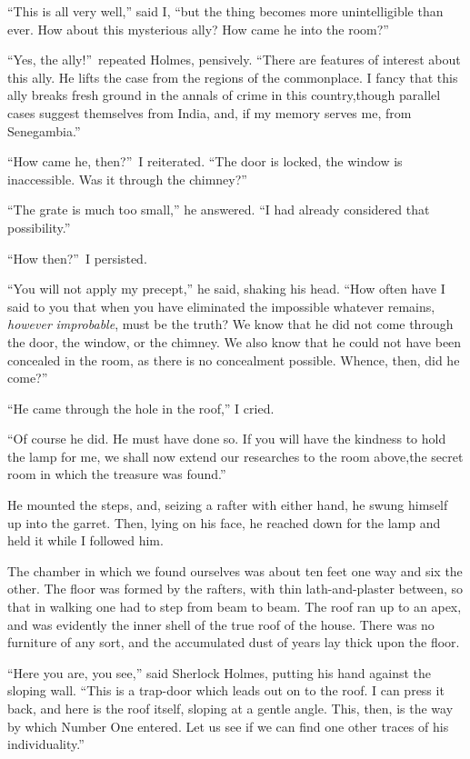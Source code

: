 \documentclass[12pt,english,oneside]{book}
\begin{document}
{}``This is all very well,'' said I, {}``but the thing becomes
more unintelligible than ever. How about this mysterious ally? How
came he into the room?''

{}``Yes, the ally!''\ repeated Holmes, pensively. {}``There are
features of interest about this ally. He lifts the case from the regions
of the commonplace. I fancy that this ally breaks fresh ground in
the annals of crime in this country,\mdsh{---}though parallel cases
suggest themselves from India, and, if my memory serves me, from Senegambia.''

{}``How came he, then?''\ I reiterated. {}``The door is locked,
the window is inaccessible. Was it through the chimney?''

{}``The grate is much too small,'' he answered. {}``I had already
considered that possibility.''

{}``How then?''\ I persisted.

{}``You will not apply my precept,'' he said, shaking his head.
{}``How often have I said to you that when you have eliminated the
impossible whatever remains, \textit{however} \textit{improbable},
must be the truth? We know that he did not come through the door,
the window, or the chimney. We also know that he could not have been
concealed in the room, as there is no concealment possible. Whence,
then, did he come?''

{}``He came through the hole in the roof,'' I cried.

{}``Of course he did. He must have done so. If you will have the
kindness to hold the lamp for me, we shall now extend our researches
to the room above,\mdsh{---}the secret room in which the treasure
was found.''

He mounted the steps, and, seizing a rafter with either hand, he swung
himself up into the garret. Then, lying on his face, he reached down
for the lamp and held it while I followed him.

The chamber in which we found ourselves was about ten feet one way
and six the other. The floor was formed by the rafters, with thin
lath-and-plaster between, so that in walking one had to step from
beam to beam. The roof ran up to an apex, and was evidently the inner
shell of the true roof of the house. There was no furniture of any
sort, and the accumulated dust of years lay thick upon the floor.

{}``Here you are, you see,'' said Sherlock Holmes, putting his hand
against the sloping wall. {}``This is a trap-door which leads out
on to the roof. I can press it back, and here is the roof itself,
sloping at a gentle angle. This, then, is the way by which Number
One entered. Let us see if we can find one other traces of his individuality.''
\end{document}
